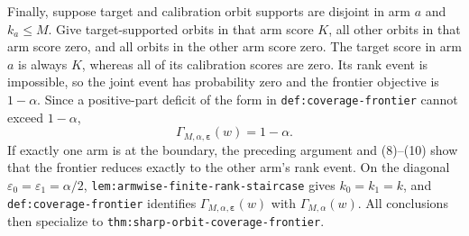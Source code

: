 Finally, suppose target and calibration orbit supports are disjoint in arm \(a\) and \(k_a\le M\). Give target-supported orbits in that arm score \(K\), all other orbits in that arm score zero, and all orbits in the other arm score zero. The target score in arm \(a\) is always \(K\), whereas all of its calibration scores are zero. Its rank event is impossible, so the joint event has probability zero and the frontier objective is \(1-\alpha\). Since a positive-part deficit of the form in \texttt{def:coverage-frontier} cannot exceed \(1-\alpha\),
\[
\Gamma_{M,\alpha,\boldsymbol\varepsilon}(w)=1-\alpha.
\]
If exactly one arm is at the boundary, the preceding argument and (8)--(10) show that the frontier reduces exactly to the other arm's rank event. On the diagonal \(\varepsilon_0=\varepsilon_1=\alpha/2\), \texttt{lem:armwise-finite-rank-staircase} gives \(k_0=k_1=k\), and \texttt{def:coverage-frontier} identifies \(\Gamma_{M,\alpha,\boldsymbol\varepsilon}(w)\) with \(\Gamma_{M,\alpha}(w)\). All conclusions then specialize to \texttt{thm:sharp-orbit-coverage-frontier}.